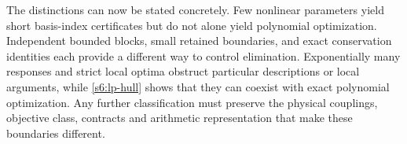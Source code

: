 The distinctions can now be stated concretely. Few nonlinear parameters
yield short basis-index certificates but do not alone yield polynomial
optimization. Independent bounded blocks, small retained boundaries,
and exact conservation identities each provide a different way to
control elimination. Exponentially many responses and strict local
optima obstruct particular descriptions or local arguments, while
\cref{s6:lp-hull} shows that they can coexist with exact polynomial
optimization. Any further classification must preserve the physical
couplings, objective class, contracts and arithmetic representation
that make these boundaries different.
